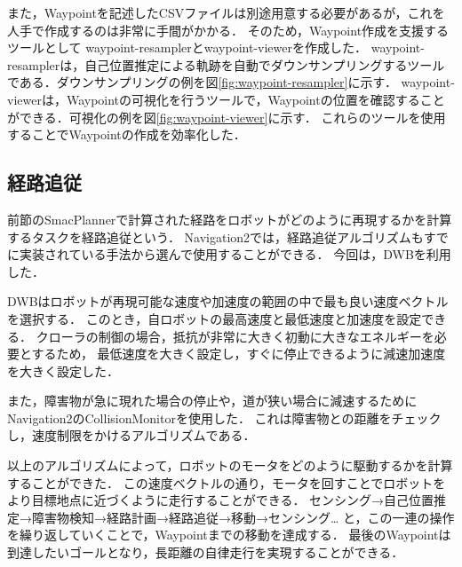 また，Waypointを記述したCSVファイルは別途用意する必要があるが，これを人手で作成するのは非常に手間がかかる．
そのため，Waypoint作成を支援するツールとして waypoint-resampler\cite{waypointmodifier}とwaypoint-viewer\cite{waypointmodifier}を作成した．
waypoint-resamplerは，自己位置推定による軌跡を自動でダウンサンプリングするツールである．ダウンサンプリングの例を図\ref{fig:waypoint-resampler}に示す．
waypoint-viewerは，Waypointの可視化を行うツールで，Waypointの位置を確認することができる．可視化の例を図\ref{fig:waypoint-viewer}に示す．
これらのツールを使用することでWaypointの作成を効率化した．

\subsection{経路追従}
前節のSmacPlannerで計算された経路をロボットがどのように再現するかを計算するタスクを経路追従という．
Navigation2では，経路追従アルゴリズムもすでに実装されている手法から選んで使用することができる．
今回は，DWBを利用した．

DWBはロボットが再現可能な速度や加速度の範囲の中で最も良い速度ベクトルを選択する．
このとき，自ロボットの最高速度と最低速度と加速度を設定できる．
クローラの制御の場合，抵抗が非常に大きく初動に大きなエネルギーを必要とするため，
最低速度を大きく設定し，すぐに停止できるように減速加速度を大きく設定した．

また，障害物が急に現れた場合の停止や，道が狭い場合に減速するためにNavigation2のCollisionMonitorを使用した．
これは障害物との距離をチェックし，速度制限をかけるアルゴリズムである．

以上のアルゴリズムによって，ロボットのモータをどのように駆動するかを計算することができた．
この速度ベクトルの通り，モータを回すことでロボットをより目標地点に近づくように走行することができる．
センシング→自己位置推定→障害物検知→経路計画→経路追従→移動→センシング…
と，この一連の操作を繰り返していくことで，Waypointまでの移動を達成する．
最後のWaypointは到達したいゴールとなり，長距離の自律走行を実現することができる．
